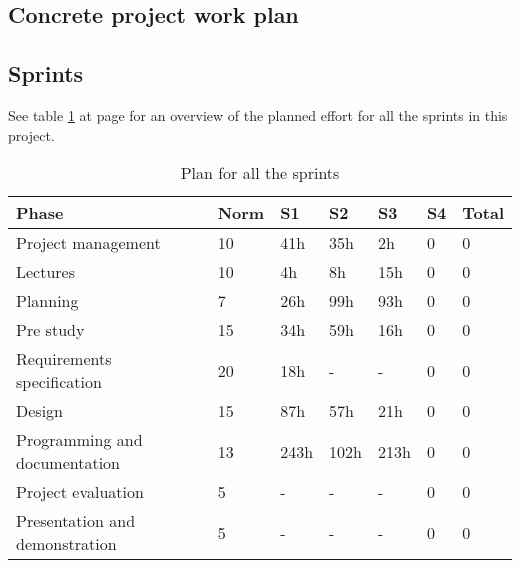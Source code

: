 

\subsection{Concrete project work plan}

\subsection*{Sprints}
See table \ref{tab:allsprints} at page \pageref{tab:allsprints} for an overview of the planned effort for all the sprints in this project.
\begin{table}
\begin{tabular}{l|l|l|l|l|l|l} \hline
\textbf{Phase} &  \textbf{Norm} & \textbf{S1} & \textbf{S2}  & \textbf{S3} & \textbf{S4} & \textbf{Total} \\ \hline \hline
Project management & 10 & 41h & 35h & 2h & 0 & 0\\
Lectures & 10 & 4h & 8h & 15h & 0 & 0\\
Planning & 7 & 26h & 99h & 93h & 0 & 0\\
Pre study & 15 & 34h & 59h & 16h & 0 & 0\\
Requirements specification & 20 & 18h & - & - & 0 & 0\\
Design & 15 & 87h & 57h & 21h & 0 & 0\\
Programming and documentation & 13 & 243h & 102h & 213h & 0 & 0\\
Project evaluation & 5 & - & - & - & 0 & 0\\
Presentation and demonstration & 5 & - & - & - & 0 & 0\\ \hline
\end{tabular}
\caption{Plan for all the sprints} \label{tab:allsprints}
\end{table}


